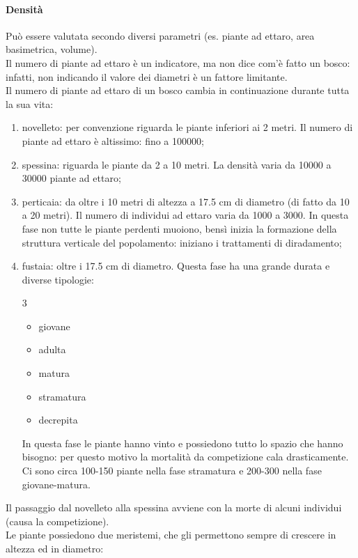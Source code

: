 \paragraph{Densità}
Può essere valutata secondo diversi parametri (es. piante ad ettaro, area basimetrica, volume).\\
Il numero di piante ad ettaro è un indicatore, ma non dice com'è fatto un bosco: infatti, non indicando il valore dei diametri è un fattore limitante.\\ 
Il numero di piante ad ettaro di un bosco cambia in continuazione durante tutta la sua vita:
\begin{enumerate}[nosep]
    \item novelleto: per convenzione riguarda le piante inferiori ai 2 metri. Il numero di piante ad ettaro è altissimo: fino a 100000;
    \item spessina: riguarda le piante da 2 a 10 metri. La densità varia da 10000 a 30000 piante ad ettaro;
    \item perticaia: da oltre i 10 metri di altezza a 17.5 cm di diametro (di fatto da 10 a 20 metri). Il numero di individui ad ettaro varia da 1000 a 3000. In questa fase non tutte le piante perdenti muoiono, bensì inizia la formazione della struttura verticale del popolamento: iniziano i trattamenti di diradamento;
    \item fustaia: oltre i 17.5 cm di diametro. Questa fase ha una grande durata e diverse tipologie:
   \begin{multicols}{3}
      \begin{itemize}[nosep]
        \item giovane
        \item adulta
        \item matura
        \item stramatura
        \item decrepita
    \end{itemize}
    \end{multicols}
    In questa fase le piante hanno vinto e possiedono tutto lo spazio che hanno bisogno: per questo motivo la mortalità da competizione cala drasticamente. Ci sono circa 100-150 piante nella fase stramatura e 200-300 nella fase giovane-matura.
\end{enumerate}
Il passaggio dal novelleto alla spessina avviene con la morte di alcuni individui (causa la competizione).\\
Le piante possiedono due meristemi, che gli permettono sempre di crescere in altezza ed in diametro:
